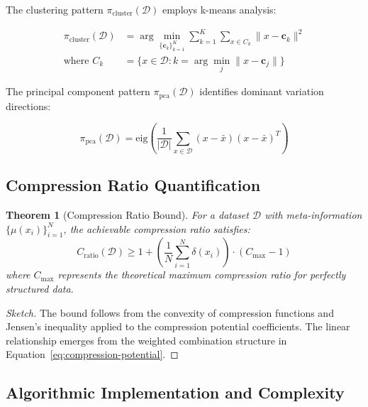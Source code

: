\documentclass[11pt,a4paper]{article}
\newtheorem{theorem}{Theorem}[section]
\begin{document}
The clustering pattern $\pi_{\text{cluster}}(\mathcal{D})$ employs k-means analysis:

\begin{align}
\pi_{\text{cluster}}(\mathcal{D}) &= \arg\min_{\{\mathbf{c}_k\}_{k=1}^K} \sum_{k=1}^K \sum_{x \in C_k} \|x - \mathbf{c}_k\|^2 \label{eq:kmeans-objective}\\
\text{where } C_k &= \{x \in \mathcal{D} : k = \arg\min_{j} \|x - \mathbf{c}_j\|\} \label{eq:cluster-assignment}
\end{align}

The principal component pattern $\pi_{\text{pca}}(\mathcal{D})$ identifies dominant variation directions:

\begin{equation}
\pi_{\text{pca}}(\mathcal{D}) = \text{eig}\left(\frac{1}{|\mathcal{D}|} \sum_{x \in \mathcal{D}} (x - \bar{x})(x - \bar{x})^T\right)
\label{eq:pca-pattern}
\end{equation}

\subsection{Compression Ratio Quantification}

\begin{theorem}[Compression Ratio Bound]
For a dataset $\mathcal{D}$ with meta-information $\{\mu(x_i)\}_{i=1}^N$, the achievable compression ratio satisfies:
\begin{equation}
C_{\text{ratio}}(\mathcal{D}) \geq 1 + \left(\frac{1}{N} \sum_{i=1}^N \delta(x_i)\right) \cdot (C_{\max} - 1)
\label{eq:compression-ratio-bound}
\end{equation}
where $C_{\max}$ represents the theoretical maximum compression ratio for perfectly structured data.
\end{theorem}

\begin{proof}[Sketch]
The bound follows from the convexity of compression functions and Jensen's inequality applied to the compression potential coefficients. The linear relationship emerges from the weighted combination structure in Equation~\eqref{eq:compression-potential}.
\end{proof}

\subsection{Algorithmic Implementation and Complexity}
\end{document}
